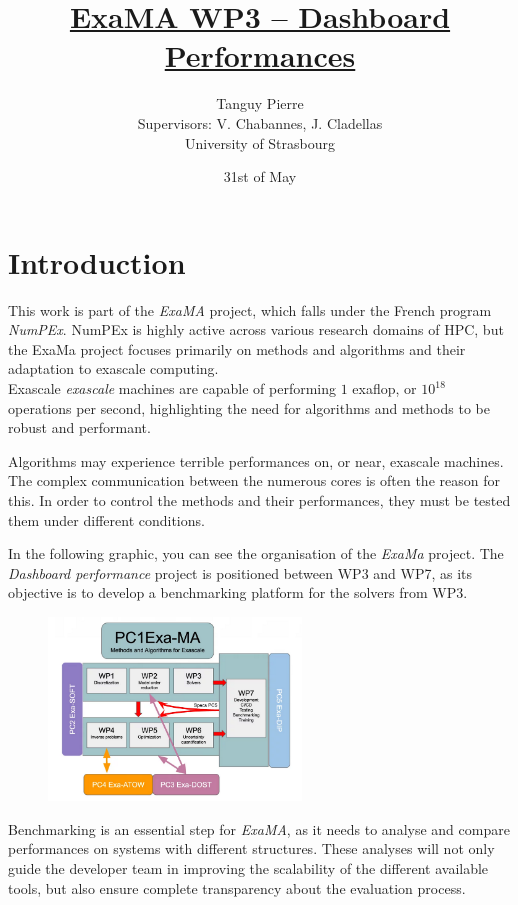 \documentclass[12pt]{article}
\title{\underline{\textbf{ExaMA WP3 -- Dashboard Performances}}}
\author{Tanguy Pierre\\
            [1cm]
            Supervisors: V. Chabannes, J. Cladellas\\
            [2cm]
            University of Strasbourg}
\date{31st of May}
\begin{document}
    \maketitle      %

\newpage
\tableofcontents


\newpage
\section{Introduction}

This work is part of the \textit{ExaMA} project, which falls under the French program \textit{NumPEx}\cite*{NumPEx}.
NumPEx is highly active across various research domains of HPC, but the ExaMa project focuses primarily on methods and algorithms and their adaptation to exascale computing. \\
Exascale \textit{exascale} machines are capable of performing $1$ exaflop, or $10^{18}$ operations per second, highlighting the need for algorithms and methods to be robust and performant.

Algorithms may experience terrible performances on, or near, exascale machines.
The complex communication between the numerous cores is often the reason for this.
In order to control the methods and their performances, they must be tested them under different conditions.

In the following graphic, you can see the organisation of the \textit{ExaMa} project.
The \textit{Dashboard performance} project is positioned between WP3 and WP7, as its objective is to develop a benchmarking platform for the solvers from WP3.
\newline
\begin{figure}[h]
    \centering
    \includegraphics[width=0.6\textwidth]{../illustrations/ExaMa-orga.png}
\end{figure}

Benchmarking is an essential step for \textit{ExaMA}, as it needs to analyse and compare performances on systems
with different structures. These analyses will not only guide the developer team in improving the scalability of the different available tools,
but also ensure complete transparency about the evaluation process.
\end{document}
